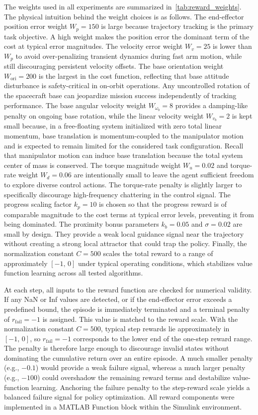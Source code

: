 \documentclass{ieeeaccess}
\begin{document}
The weights used in all experiments are summarized in~\autoref{tab:reward_weights}.
The physical intuition behind the weight choices is as follows.
The end-effector position error weight $W_p = 150$ is large because trajectory tracking is
the primary task objective. A high weight makes the position error the dominant term
of the cost at typical error magnitudes.
The velocity error weight $W_v = 25$ is lower than $W_p$ to avoid over-penalizing
transient dynamics during fast arm motion, while still discouraging persistent velocity offsets.
The base orientation weight $W_{\text{ori}} = 200$ is the largest in the cost function,
reflecting that base attitude disturbance is safety-critical in on-orbit operations. Any uncontrolled rotation of
the spacecraft base can jeopardize mission success independently of tracking performance.
The base angular velocity weight $W_{\omega_b} = 8$ provides a damping-like penalty on ongoing
base rotation, while the linear velocity weight $W_{v_b} = 2$ is kept small because,
in a free-floating system initialized with zero total linear momentum, base translation is momentum-coupled
to the manipulator motion and is expected to remain limited for the considered task
configuration. Recall that manipulator motion can induce base translation because the total system center
of mass is conserved. The torque magnitude weight $W_u = 0.02$ and torque-rate weight
$W_d = 0.06$ are intentionally small to leave the agent sufficient freedom to explore
diverse control actions. The torque-rate penalty is slightly larger to specifically discourage high-frequency chattering
in the control signal.
The progress scaling factor $k_p = 10$ is chosen so that the progress reward
is of comparable magnitude to the cost terms at typical error levels, preventing it
from being dominated.
The proximity bonus parameters $k_b = 0.05$ and $\sigma = 0.02$ are small by
design. They provide a weak local guidance signal near the trajectory without creating a
strong local attractor that could trap the policy.
Finally, the normalization constant $C = 500$ scales the total reward to a range
of approximately $[-1,\, 0]$ under typical operating conditions, which stabilizes value function learning across
all tested algorithms.

At each step, all inputs to the reward function are checked for numerical validity.
If any NaN or Inf values are detected, or if the end-effector error exceeds
a predefined bound, the episode is immediately terminated and a terminal penalty of $r_{\text{fail}} = -1$
is assigned. This value is matched to the reward scale. With the normalization constant
$C = 500$, typical step rewards lie approximately in $[-1,\,0]$, so $r_{\text{fail}} = -1$
corresponds to the lower end of the one-step reward range. The penalty is therefore
large enough to discourage invalid states without dominating the cumulative return over an entire
episode. A much smaller penalty (e.g., $-0.1$) would provide a weak failure signal, whereas
a much larger penalty (e.g., $-100$) could overshadow the remaining reward terms and destabilize
value-function learning. Anchoring the failure penalty to the step-reward scale yields a balanced failure
signal for policy optimization.
All reward components were implemented in a MATLAB Function block within the Simulink environment.
\end{document}
